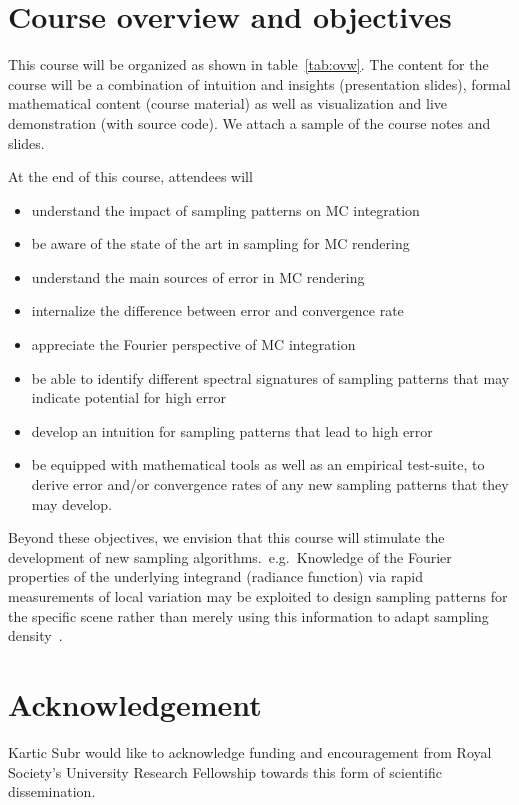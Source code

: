 \documentclass{acmsiggraph}
\begin{document}
\section{Course overview and objectives}
This course will be organized as shown in table~\ref{tab:ovw}. The content for the course will be a combination of intuition and insights (presentation slides), formal mathematical content (course material) as well as visualization and live demonstration (with source code). We attach a sample of the course notes and slides.



At the end of this course, attendees will 
\begin{itemize}[noitemsep,topsep=-1em,leftmargin=*]
\item understand the impact of sampling patterns on MC integration
\item be aware of the state of the art in sampling for MC rendering
\item understand the main sources of error in MC rendering 
\item internalize the difference between error and convergence rate
\item appreciate the Fourier perspective of MC integration
\item be able to identify different spectral signatures of sampling patterns that may indicate potential for high error
\item develop an intuition for sampling patterns that lead to high error
\item be equipped with mathematical tools as well as an empirical test-suite, to derive error and/or convergence rates of any new sampling patterns that they may develop.
\end{itemize}
Beyond these objectives, we envision that this course will stimulate the development of new sampling algorithms.~e.g.~Knowledge of the Fourier properties of the underlying integrand (radiance function) via rapid measurements of local variation may be exploited to design sampling patterns for the specific scene rather than merely using this information to adapt sampling density~\cite{Cov5D}.


\section*{Acknowledgement}
Kartic Subr would like to acknowledge funding and encouragement from Royal Society's University Research Fellowship towards this form of scientific dissemination.



\end{document}
